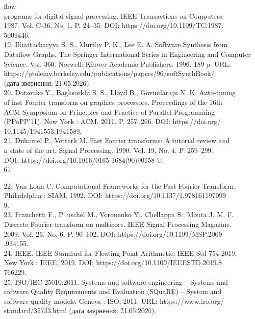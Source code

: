 \documentclass[
]{article}
\begin{document}
flow\\
programs for digital signal processing. IEEE Transactions on
Computers.\\
1987. Vol. C-36, No. 1. P. 24--35. DOI:
https://doi.org/10.1109/TC.1987.\\
5009446.\\
19. Bhattacharyya S. S., Murthy P. K., Lee E. A. Software Synthesis
from\\
Dataflow Graphs. The Springer International Series in Engineering and
Computer Science. Vol. 360. Norwell: Kluwer Academic Publishers, 1996.
189 p. URL:\\
https://ptolemy.berkeley.edu/publications/papers/96/softSynthBook/\\
(дата звернення: 21.05.2026).\\
20. Dotsenko Y., Baghsorkhi S. S., Lloyd B., Govindaraju N. K.
Auto-tuning\\
of fast Fourier transform on graphics processors. Proceedings of the
16th\\
ACM Symposium on Principles and Practice of Parallel Programming\\
(PPoPP'11). New York : ACM, 2011. P. 257--266. DOI: https://doi.org/\\
10.1145/1941553.1941589.\\
21. Duhamel P., Vetterli M. Fast Fourier transforms: A tutorial review
and\\
a state of the art. Signal Processing. 1990. Vol. 19, No. 4. P.
259--299.\\
DOI: https://doi.org/10.1016/0165-1684(90)90158-U.\\
61

22. Van Loan C. Computational Frameworks for the Fast Fourier
Transform.\\
Philadelphia : SIAM, 1992. DOI: https://doi.org/10.1137/1.978161197099\\
9.\\
23. Franchetti F., P¨uschel M., Voronenko Y., Chellappa S., Moura J. M.
F.\\
Discrete Fourier transform on multicore. IEEE Signal Processing
Magazine.\\
2009. Vol. 26, No. 6. P. 90--102. DOI:
https://doi.org/10.1109/MSP.2009\\
.934155.\\
24. IEEE. IEEE Standard for Floating-Point Arithmetic. IEEE Std
754-2019.\\
New York : IEEE, 2019. DOI: https://doi.org/10.1109/IEEESTD.2019.8\\
766229.\\
25. ISO/IEC 25010:2011. Systems and software engineering -- Systems
and\\
software Quality Requirements and Evaluation (SQuaRE) -- System and\\
software quality models. Geneva : ISO, 2011. URL: https://www.iso.org/\\
standard/35733.html (дата звернення: 21.05.2026).
\end{document}
